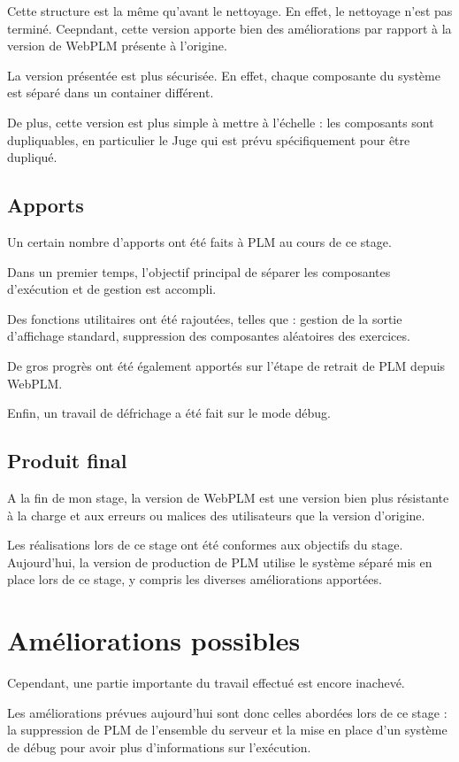 \documentclass[stage]{tnreport}
\begin{document}
Cette structure est la même qu'avant le nettoyage. En effet, le nettoyage n'est pas terminé. Ceepndant, cette version apporte bien des améliorations par rapport à la version de WebPLM présente à l'origine.

La version présentée est plus sécurisée. En effet, chaque composante du système est séparé dans un container différent.

De plus, cette version est plus simple à mettre à l'échelle : les composants sont dupliquables, en particulier le Juge qui est prévu spécifiquement pour être dupliqué.

 \subsection{Apports}

Un certain nombre d'apports ont été faits à PLM au cours de ce stage.

Dans un premier temps, l'objectif principal de séparer les composantes d'exécution et de gestion est accompli.

Des fonctions utilitaires ont été rajoutées, telles que : gestion de la sortie d'affichage standard, suppression des composantes aléatoires des exercices.

De gros progrès ont été également apportés sur l'étape de retrait de PLM depuis WebPLM.

Enfin, un travail de défrichage a été fait sur le mode débug.

\subsection{Produit final}

A la fin de mon stage, la version de WebPLM est une version bien plus résistante à la charge et aux erreurs ou malices des utilisateurs que la version d'origine.

Les réalisations lors de ce stage ont été conformes aux objectifs du stage. Aujourd'hui, la version de production de PLM utilise le système séparé mis en place lors de ce stage, y compris les diverses améliorations apportées.

\section{Améliorations possibles}

Cependant, une partie importante du travail effectué est encore inachevé.

Les améliorations prévues aujourd'hui sont donc celles abordées lors de ce stage : la suppression de PLM de l'ensemble du serveur et la mise en place d'un système de débug pour avoir plus d'informations sur l'exécution.
\end{document}

